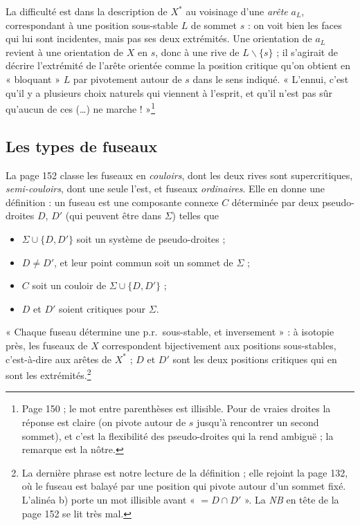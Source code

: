 \documentclass[11pt,a4paper]{article}
\begin{document}
La difficulté est dans la description de $X^{*}$ au voisinage
d'une \emph{arête} $a_L$, correspondant à une position sous-stable $L$ de
sommet $s$ : on voit bien les faces qui lui sont incidentes, mais pas ses deux
extrémités. Une orientation de $a_L$ revient à une orientation de $X$ en $s$,
donc à une rive de $L \smallsetminus \lbrace s \rbrace$ ; il s'agirait de décrire
l'extrémité de l'arête orientée comme la position critique qu'on obtient en
« bloquant » $L$ par pivotement autour de $s$ dans le sens indiqué. « L'ennui,
c'est qu'il y a plusieurs choix naturels qui viennent à l'esprit, et qu'il
n'est pas sûr qu'aucun de ces (\ldots) ne marche ! »\footnote{Page 150 ; le mot
entre parenthèses est illisible. Pour de vraies droites la réponse est claire
(on pivote autour de $s$ jusqu'à rencontrer un second sommet), et c'est la
flexibilité des pseudo-droites qui la rend ambiguë ; la remarque est la nôtre.}

\subsection*{Les types de fuseaux}

La page 152 classe les fuseaux en \emph{couloirs}, dont les deux rives sont
supercritiques, \emph{semi-couloirs}, dont une seule l'est, et fuseaux
\emph{ordinaires}. Elle en donne une définition : un fuseau est une composante
connexe $C$ déterminée par deux pseudo-droites $D$, $D'$ (qui peuvent être dans
$\Sigma$) telles que
\begin{itemize}
\item[a)] $\Sigma \cup \lbrace D, D' \rbrace$ soit un système de pseudo-droites ;
\item[b)] $D \neq D'$, et leur point commun soit un sommet de $\Sigma$ ;
\item[c)] $C$ soit un couloir de $\Sigma \cup \lbrace D, D' \rbrace$ ;
\item[d)] $D$ et $D'$ soient critiques pour $\Sigma$.
\end{itemize}
« Chaque fuseau détermine une p.r.\ sous-stable, et inversement » : à isotopie
près, les fuseaux de $X$ correspondent bijectivement aux positions
sous-stables, c'est-à-dire aux arêtes de $X^{*}$ ; $D$ et $D'$ sont les deux
positions critiques qui en sont les extrémités.\footnote{La dernière phrase est
notre lecture de la définition ; elle rejoint la page 132, où le fuseau est
balayé par une position qui pivote autour d'un sommet fixé. L'alinéa b) porte
un mot illisible avant « $= D \cap D'$ ». La \emph{NB} en tête de la page 152 se
lit très mal.}
\end{document}
